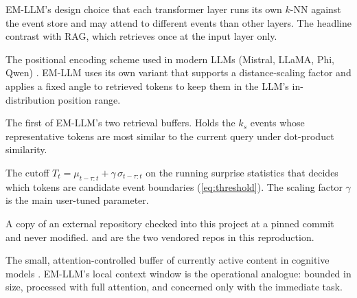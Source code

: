 \begin{description}[style=nextline,itemsep=0.4em]
  \item[Per-layer retrieval]
  EM-LLM's design choice that each transformer layer runs its own $k$-NN against the event store and may attend to different events than other layers. The headline contrast with RAG, which retrieves once at the input layer only.

  \item[RoPE (rotary position embedding)]
  The positional encoding scheme used in modern LLMs (Mistral, LLaMA, Phi, Qwen) \cite{su2024roformer}. EM-LLM uses its own  variant that supports a distance-scaling factor and applies a fixed angle to retrieved tokens to keep them in the LLM's in-distribution position range.

  \item[Similarity buffer]
  The first of EM-LLM's two retrieval buffers. Holds the $k_s$ events whose representative tokens are most similar to the current query under dot-product similarity.

  \item[Surprise threshold]
  The cutoff $T_t = \mu_{t-\tau:t} + \gamma \, \sigma_{t-\tau:t}$ on the running surprise statistics that decides which tokens are candidate event boundaries (\cref{eq:threshold}). The scaling factor $\gamma$ is the main user-tuned parameter.

  \item[Vendored upstream]
  A copy of an external repository checked into this project at a pinned commit and never modified.  and  are the two vendored repos in this reproduction.

  \item[Working memory]
  The small, attention-controlled buffer of currently active content in cognitive models \cite{baddeley1992working, cowan2001focus}. EM-LLM's local context window is the operational analogue: bounded in size, processed with full attention, and concerned only with the immediate task.
\end{description}
